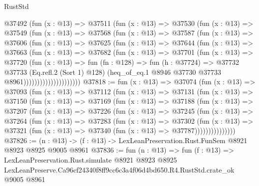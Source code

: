 \begin{lexlean}{RustStd}
\begin{coremodule}
                @37492
                  (fun (x : @13) =>
                  @37511
                    (fun (x : @13) =>
                    @37530
                      (fun (x : @13) =>
                      @37549
                        (fun (x : @13) =>
                        @37568
                          (fun (x : @13) =>
                          @37587
                            (fun (x : @13) =>
                            @37606
                              (fun (x : @13) =>
                              @37625
                                (fun (x : @13) =>
                                @37644
                                  (fun (x : @13) =>
                                  @37663
                                    (fun (x : @13) =>
                                    @37682
                                      (fun (x : @13) =>
                                      @37701
                                        (fun (x : @13) =>
                                        @37720
                                          (fun (x : @13) =>
                                          fun (fn : @128) =>
                                          fun (h : @37724) =>
                                          @37732
                                            @37733
                                            (Eq.refl.{2} (Sort 1) @128)
                                            (heq_of_eq.{1}
                                              @8946
                                              @37730
                                              @37733
                                              @8961)))))))))))))))))))))
@37818 := fun (x : @13) =>
  @37074
    (fun (x : @13) =>
    @37093
      (fun (x : @13) =>
      @37112
        (fun (x : @13) =>
        @37131
          (fun (x : @13) =>
          @37150
            (fun (x : @13) =>
            @37169
              (fun (x : @13) =>
              @37188
                (fun (x : @13) =>
                @37207
                  (fun (x : @13) =>
                  @37226
                    (fun (x : @13) =>
                    @37245
                      (fun (x : @13) =>
                      @37264
                        (fun (x : @13) =>
                        @37283
                          (fun (x : @13) =>
                          @37302
                            (fun (x : @13) =>
                            @37321 (fun (x : @13) => @37340 (fun (x : @13) => @37787)))))))))))))))
@37826 := (n : @13) -> (f : @13) -> LexLeanPreservation.Rust.FunSem @8921 @8923 @8925 @9005 @8961
@37836 := fun (n : @13) =>
  fun (f : @13) =>
  LexLeanPreservation.Rust.simulate
    @8921
    @8923
    @8925
    LexLeanPreserve.Ca96cf24340f8ff9cc6c3a4f06d4bd650.R4.RustStd.crate_ok
    @9005
    @8961
\end{coremodule}
\end{lexlean}
